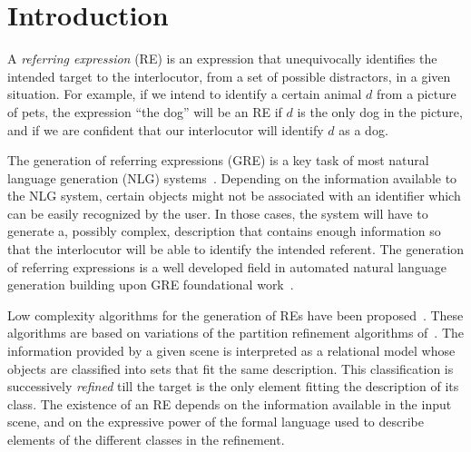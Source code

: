 \section{Introduction}\label{sec:gre}

A \emph{referring expression} (RE) is an expression that 
unequivocally identifies the intended target to the interlocutor, from a set of possible distractors, in a given situation.  
For example, if we intend to identify a certain animal $d$ from a picture of pets, the expression 
``the dog'' will be an RE if $d$ is the only dog in the picture, and if we are confident
that our interlocutor will identify $d$ as a dog. 

The generation of referring expressions (GRE)  is a key task of most natural 
language generation (NLG) systems~\cite{dale2000}. 
Depending on the information available to the NLG system, certain objects might 
not be associated with an identifier which can be easily recognized by the user. 
In those cases, the system will have to generate a, possibly complex, description that contains 
enough information so that the interlocutor will be able to identify the intended referent.
The generation of referring expressions is a well developed field in automated natural language generation building upon GRE foundational work~\cite{winograd,dale89cooking,Dale1995}. 

Low complexity algorithms for the generation 
of REs have been proposed~\cite{arec2:2008:Areces,arec:usin11}. These algorithms are based on variations of the partition refinement algorithms of~\cite{paig:thre87}.
The information provided by a given scene is interpreted as a relational model whose 
objects are classified into sets that fit the same description.  
This classification is successively \emph{refined}  till the target 
is the only element fitting the description of its class.  The existence of an RE 
depends on the information available in the input scene, and on the expressive power of the formal 
language used to describe elements of the different classes in the refinement. 


